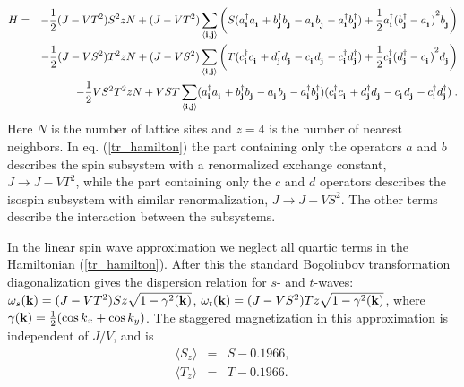 \begin{eqnarray}
\label{tr_hamilton}
H & = & -{1\over 2} (J - VT^2 )S^2 z N  +
(J - VT^2 ) \sum_{\langle {\bf i,j} \rangle}
\left (
S (
a^{\dagger}_{\bf i} a^{\phantom{\dagger}}_{\bf i} +
b^{\dagger}_{\bf j} b^{\phantom{\dagger}}_{\bf j} -
a^{\phantom{\dagger}}_{\bf i} b^{\phantom{\dagger}}_{\bf j} -
a^{\dagger}_{\bf i} b^{\dagger}_{\bf j}
) + {1\over 2}
a^{\dagger}_{\bf i} 
{ (   b^{\dagger}_{\bf j} - a^{\phantom{\dagger}}_{\bf i}    ) }^2
b^{\phantom{\dagger}}_{\bf j}
\right )
\\
&  & -{1\over 2} (J - VS^2 )T^2 z N  +
(J - VS^2 ) \sum_{\langle {\bf i,j} \rangle}
\left (
T (
c^{\dagger}_{\bf i} c^{\phantom{\dagger}}_{\bf i} +
d^{\dagger}_{\bf j} d^{\phantom{\dagger}}_{\bf j} -
c^{\phantom{\dagger}}_{\bf i} d^{\phantom{\dagger}}_{\bf j} -
c^{\dagger}_{\bf i} d^{\dagger}_{\bf j}
) + {1\over 2}
c^{\dagger}_{\bf i} 
{ (   d^{\dagger}_{\bf j} - c^{\phantom{\dagger}}_{\bf i}    ) }^2
d^{\phantom{\dagger}}_{\bf j}
\right )
\nonumber \\
&  & -{1\over 2} VS^2T^2 z N  +
VST \sum_{\langle {\bf i,j} \rangle}
(
a^{\dagger}_{\bf i} a^{\phantom{\dagger}}_{\bf i} +
b^{\dagger}_{\bf j} b^{\phantom{\dagger}}_{\bf j} -
a^{\phantom{\dagger}}_{\bf i} b^{\phantom{\dagger}}_{\bf j} -
a^{\dagger}_{\bf i} b^{\dagger}_{\bf j}
)
(
c^{\dagger}_{\bf i} c^{\phantom{\dagger}}_{\bf i} +
d^{\dagger}_{\bf j} d^{\phantom{\dagger}}_{\bf j} -
c^{\phantom{\dagger}}_{\bf i} d^{\phantom{\dagger}}_{\bf j} -
c^{\dagger}_{\bf i} d^{\dagger}_{\bf j}
) \; .
\nonumber
\end{eqnarray}
Here $N$ is the number of lattice sites and $z=4$ is the number 
of nearest neighbors. In eq. (\ref{tr_hamilton})
the part containing only the operators
$a$ and $b$ describes the spin subsystem with a renormalized exchange 
constant, $J \to J-VT^2$, while the part containing only the 
$c$ and $d$ operators describes the isospin subsystem with 
similar renormalization, $J \to J-VS^2$.
The other terms describe the interaction between the subsystems.

In the linear spin wave approximation we neglect all quartic terms
in the Hamiltonian (\ref{tr_hamilton}). After this the standard 
\cite{STAND} Bogoliubov transformation diagonalization gives the
dispersion relation for $s$- and $t$-waves:
$\omega_s({\bf k})  =  (J-VT^2)S z\sqrt{ 1 - \gamma^2({\bf k}) }$,
$\omega_t({\bf k})  =  (J-VS^2)T z \sqrt{ 1 - \gamma^2({\bf k}) }$,
where $\gamma({\bf k}) = {1\over 2} (\cos k_x + \cos k_y )$.
The staggered magnetization in this approximation is
independent of $J/V$, and is
\begin{eqnarray}
\label{SzTz}
\langle S_z \rangle &=&S-0.1966,\\
\langle T_z \rangle &=&T-0.1966.\nonumber
\end{eqnarray}

